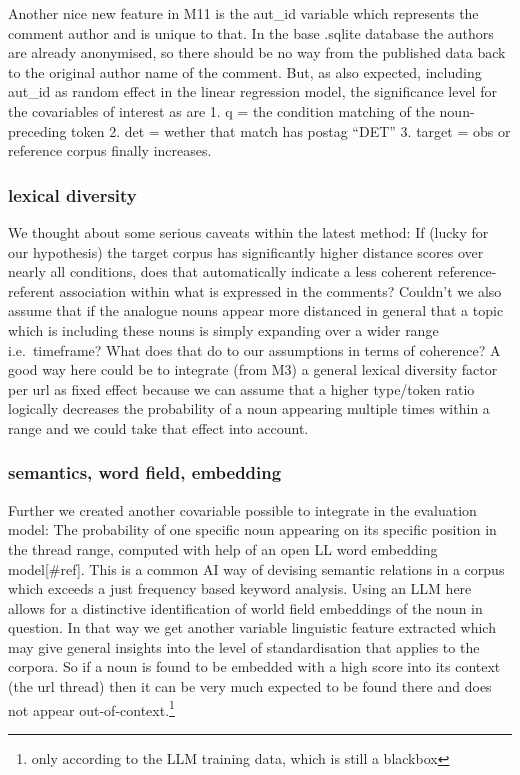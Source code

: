 \documentclass[
]{article}
\begin{document}
Another nice new feature in M11 is the aut\_id variable which represents the comment author and is unique to that. In the base .sqlite database the authors are already anonymised, so there should be no way from the published data back to the original author name of the comment. But, as also expected, including aut\_id as random effect in the linear regression model, the significance level for the covariables of interest as are
1. q = the condition matching of the noun-preceding token
2. det = wether that match has postag ``DET''
3. target = obs or reference corpus
finally increases.

\subsubsection{lexical diversity}\label{lexical-diversity}

We thought about some serious caveats within the latest method: If (lucky for our hypothesis) the target corpus has significantly higher distance scores over nearly all conditions, does that automatically indicate a less coherent reference-referent association within what is expressed in the comments? Couldn't we also assume that if the analogue nouns appear more distanced in general that a topic which is including these nouns is simply expanding over a wider range i.e.~timeframe? What does that do to our assumptions in terms of coherence? A good way here could be to integrate (from M3) a general lexical diversity factor per url as fixed effect because we can assume that a higher type/token ratio logically decreases the probability of a noun appearing multiple times within a range and we could take that effect into account.

\subsubsection{semantics, word field, embedding}\label{semantics-word-field-embedding}

Further we created another covariable possible to integrate in the evaluation model: The probability of one specific noun appearing on its specific position in the thread range, computed with help of an open LL word embedding model{[}\#ref{]}. This is a common AI way of devising semantic relations in a corpus which exceeds a just frequency based keyword analysis. Using an LLM here allows for a distinctive identification of world field embeddings of the noun in question. In that way we get another variable linguistic feature extracted which may give general insights into the level of standardisation that applies to the corpora. So if a noun is found to be embedded with a high score into its context (the url thread) then it can be very much expected to be found there and does not appear out-of-context.\footnote{only according to the LLM training data, which is still a blackbox}
\end{document}
